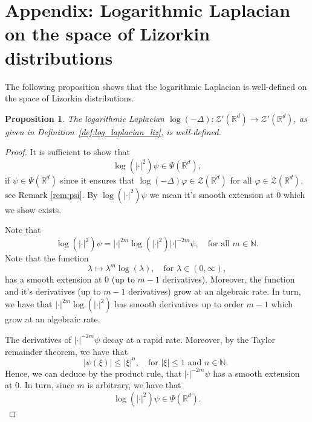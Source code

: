 \documentclass[11pt]{amsart}
\newcommand{\R}{\mathbb{R}}
\newcommand{\N}{\mathbb{N}}
\newtheorem{proposition}{Proposition}
\begin{document}
\section*{Appendix: Logarithmic Laplacian on the space of Lizorkin distributions}
\label{appendix:log_lizorkin}
The following proposition shows that the logarithmic Laplacian is well-defined on the space of Lizorkin distributions. 
\begin{proposition}
	The logarithmic Laplacian $\log(-\Delta):\mathcal{Z}'(\R^d)\rightarrow \mathcal{Z}'(\R^d)$, as given in Definition~\ref{def:log_laplacian_liz}, is well-defined. 
\end{proposition}
\begin{proof}
	It is sufficient to show that 
	\begin{equation*}
		\log(|\cdot|^2)\psi\in \Psi(\R^d),
	\end{equation*}
	if $\psi\in \Psi(\R^d)$ since it ensures that $\log(-\Delta)\varphi \in \mathcal{Z}(\R^d)$ for all $\varphi\in \mathcal{Z}(\R^d)$, see Remark \ref{rem:psi}. By $\log(|\cdot|^2)\psi$ we mean it's smooth extension at $0$ which we show exists.
	
	Note that 
	\begin{equation*}
		\log(|\cdot|^2)\psi=		|\cdot|^{2m}\log(|\cdot|^2)|\cdot|^{-2m}\psi, \quad 
	\text{for all $m\in \N$.} 
	\end{equation*} 
	Note that the function
	\begin{equation*}
		\lambda \mapsto \lambda^m\log(\lambda), \quad \text{for $\lambda\in (0,\infty)$},
	\end{equation*}
	has a smooth extension at $0$ (up to $m-1$ derivatives). Moreover, the function and it's derivatives (up to $m-1$ derivatives) grow at an algebraic rate. In turn, we have that $|\cdot|^{2m}\log(|\cdot|^2)$ has smooth derivatives up to order $m-1$ which grow at an algebraic rate. 
	
	The derivatives of $|\cdot|^{-2m}\psi$ decay at a rapid rate. Moreover, by the Taylor remainder theorem, we have that 
	\begin{equation*}
	|\psi(\xi)|\leq |\xi|^n,\quad \text{for $|\xi|\leq 1$ and $n\in \N$. }
	\end{equation*}
	Hence, we can deduce by the product rule, that $|\cdot|^{-2m}\psi$ has a smooth extension at $0$. In turn, since $m$ is arbitrary, we have that 
		\begin{equation*}
	\log(|\cdot|^2)\psi\in \Psi(\R^d).
	\end{equation*}
\end{proof}

\end{document}
